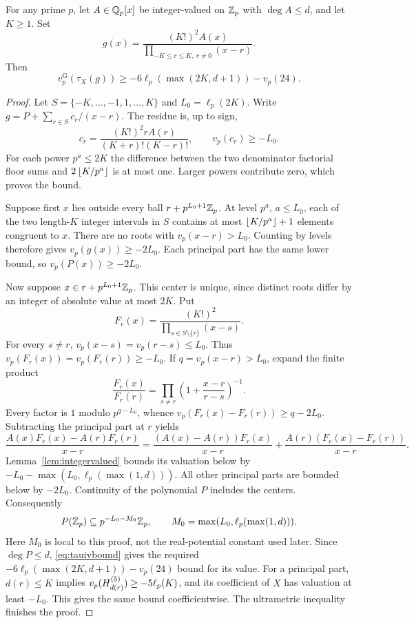 \begin{proposition}
\label{prop:smallprime}
For any prime $p$, let $A\in\mathbb Q_p[x]$ be integer-valued on $\mathbb Z_p$ with
$\deg A\le d$, and let $K\ge1$. Set
\[
 g(x)=\frac{(K!)^2A(x)}{\prod_{-K\le r\le K,\ r\ne0}(x-r)}.
\]
Then
\begin{equation}\label{eq:smallprime}
 v_p^{\mathrm G}(\tau_X(g))
 \ge-6\ell_p(\max(2K,d+1))-v_p(24).
\end{equation}
\end{proposition}
\begin{proof}
Let $S=\{-K,\ldots,-1,1,\ldots,K\}$ and $L_0=\ell_p(2K)$.
Write $g=P+\sum_{r\in S}c_r/(x-r)$. The residue is, up to sign,
\[
 c_r=\frac{(K!)^2rA(r)}{(K+r)!(K-r)!},\qquad v_p(c_r)\ge-L_0.
\]
For each power $p^a\le2K$ the difference between the two denominator
factorial floor sums and $2\left\lfloor K/p^a\right\rfloor$ is at most one. Larger powers
contribute zero, which proves the bound.

Suppose first $x$ lies outside every ball $r+p^{L_0+1}\mathbb Z_p$. At level
$p^a$, $a\le L_0$, each of the two length-$K$ integer intervals in $S$
contains at most $\left\lfloor K/p^a\right\rfloor+1$ elements congruent to $x$. There are
no roots with $v_p(x-r)>L_0$. Counting by levels therefore gives
$v_p(g(x))\ge-2L_0$. Each principal part has the same lower bound, so
$v_p(P(x))\ge-2L_0$.

Now suppose $x\in r+p^{L_0+1}\mathbb Z_p$. This center is unique, since distinct
roots differ by an integer of absolute value at most $2K$. Put
\[
 F_r(x)=\frac{(K!)^2}{\prod_{s\in S\setminus\{r\}}(x-s)}.
\]
For every $s\ne r$, $v_p(x-s)=v_p(r-s)\le L_0$. Thus
$v_p(F_r(x))=v_p(F_r(r))\ge-L_0$. If $q=v_p(x-r)>L_0$, expand the
finite product
\[
 \frac{F_r(x)}{F_r(r)}
 =\prod_{s\ne r}\left(1+\frac{x-r}{r-s}\right)^{-1}.
\]
Every factor is $1$ modulo $p^{q-L_0}$, whence
$v_p(F_r(x)-F_r(r))\ge q-2L_0$. Subtracting the principal part at $r$
yields
\[
 \frac{A(x)F_r(x)-A(r)F_r(r)}{x-r}
 =\frac{(A(x)-A(r))F_r(x)}{x-r}
  +\frac{A(r)(F_r(x)-F_r(r))}{x-r}.
\]
Lemma~\ref{lem:integervalued} bounds its valuation below by
$-L_0-\max(L_0,\ell_p(\max(1,d)))$. All other principal parts are bounded
below by $-2L_0$. Continuity of the polynomial $P$ includes the centers.
Consequently
\[
 P(\mathbb Z_p)\subseteq p^{-L_0-M_0}\mathbb Z_p,
 \qquad M_0=\max(L_0,\ell_p(\max(1,d))).
\]
Here $M_0$ is local to this proof, not the real-potential constant used
later. Since $\deg P\le d$, \eqref{eq:tauivbound} gives the required
$-6\ell_p(\max(2K,d+1))-v_p(24)$ bound for its value. For a principal
part, $d(r)\le K$ implies
$v_p(H^{(5)}_{d(r)})\ge-5\ell_p(K)$, and its coefficient of $X$ has
valuation at least $-L_0$. This gives the same bound coefficientwise.
The ultrametric inequality finishes the proof.
\end{proof}

